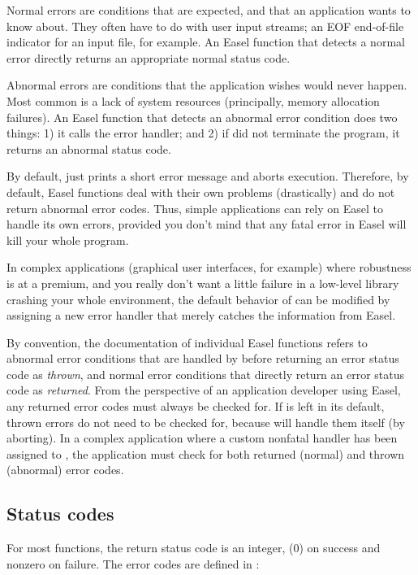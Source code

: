 \documentclass[11pt]{article}
\begin{document}
Normal errors are conditions that are expected, and that an
application wants to know about. They often have to do with user input
streams; an EOF end-of-file indicator for an input file, for
example. An Easel function that detects a normal error directly
returns an appropriate normal status code.

Abnormal errors are conditions that the application wishes would never
happen. Most common is a lack of system resources (principally, memory
allocation failures). An Easel function that detects an abnormal error
condition does two things: 1) it calls the  error
handler; and 2) if  did not terminate the program,
it returns an abnormal status code.

By default,  just prints a short error message and
aborts execution. Therefore, by default, Easel functions deal with
their own problems (drastically) and do not return abnormal error
codes. Thus, simple applications can rely on Easel to handle its own
errors, provided you don't mind that any fatal error in Easel will
kill your whole program.

In complex applications (graphical user interfaces, for example) where
robustness is at a premium, and you really don't want a little failure
in a low-level library crashing your whole environment, the default
behavior of  can be modified by assigning a new
error handler that merely catches the information from Easel.

By convention, the documentation of individual Easel functions refers
to abnormal error conditions that are handled by 
before returning an error status code as \emph{thrown}, and normal
error conditions that directly return an error status code as
\emph{returned}.  From the perspective of an application developer
using Easel, any returned error codes must always be checked for. If
 is left in its default, thrown errors do not need
to be checked for, because  will handle them itself
(by aborting). In a complex application where a custom nonfatal
handler has been assigned to , the application
must check for both returned (normal) and thrown (abnormal) error
codes.

\subsection{Status codes}

For most functions, the return status code is an integer,
 (0) on success and nonzero on failure. The error
codes are defined in :
\end{document}
